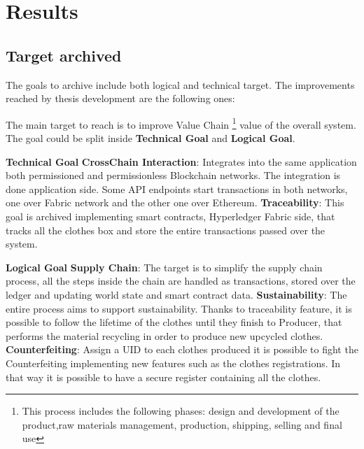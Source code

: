 \chapter{Results}

\section{Target archived}

The goals to archive include both logical and technical target. 
The improvements reached by thesis development are the following ones:

\newline
The main target to reach is to improve Value Chain \footnote{This process includes the following phases: design and 
development of the product,raw materials management, production, shipping, selling and final use} value of the 
overall system.
\newline
The goal could be split inside \textbf{Technical Goal} and \textbf{Logical Goal}.

\begin{outline}
    \1 \textbf{Technical Goal}
    \2 \textbf{CrossChain Interaction}: Integrates into the same application both permissioned and permissionless 
    Blockchain networks. The integration is done application side. Some API endpoints start transactions in both 
    networks, one over Fabric network and the other one over Ethereum.
    \2 \textbf{Traceability}: This goal is archived implementing smart contracts, Hyperledger Fabric side,
    that tracks all the clothes box and store the entire transactions passed over the system. 
    
    \1 \textbf{Logical Goal}
    \2 \textbf{Supply Chain}: The target is to simplify the supply chain process, all the steps inside the chain
    are handled as transactions, stored over the ledger and updating world state and smart contract data. 
    \2 \textbf{Sustainability}: The entire process aims to support sustainability. Thanks to traceability feature,
    it is possible to follow the lifetime of the clothes until they finish to Producer, that performs the 
    material recycling in order to produce new upcycled clothes.   
    \2 \textbf{Counterfeiting}: Assign a UID to each clothes produced it is possible to fight the Counterfeiting 
    implementing new features such as the clothes registrations. In that way it is possible to have a secure register 
    containing all the clothes.
\end{outline}

